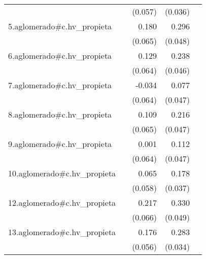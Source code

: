 {\begin{longtable}{l*{4}{D{.}{.}{-1}}}
            &                     &     (0.057)         &     (0.036)         &                     \\
\addlinespace
5.aglomerado#c.hv\_propieta&                     &       0.180\sym{**} &       0.296\sym{***}&                     \\
            &                     &     (0.065)         &     (0.048)         &                     \\
\addlinespace
6.aglomerado#c.hv\_propieta&                     &       0.129\sym{*}  &       0.238\sym{***}&                     \\
            &                     &     (0.064)         &     (0.046)         &                     \\
\addlinespace
7.aglomerado#c.hv\_propieta&                     &      -0.034         &       0.077         &                     \\
            &                     &     (0.064)         &     (0.047)         &                     \\
\addlinespace
8.aglomerado#c.hv\_propieta&                     &       0.109         &       0.216\sym{***}&                     \\
            &                     &     (0.065)         &     (0.047)         &                     \\
\addlinespace
9.aglomerado#c.hv\_propieta&                     &       0.001         &       0.112\sym{*}  &                     \\
            &                     &     (0.064)         &     (0.047)         &                     \\
\addlinespace
10.aglomerado#c.hv\_propieta&                     &       0.065         &       0.178\sym{***}&                     \\
            &                     &     (0.058)         &     (0.037)         &                     \\
\addlinespace
12.aglomerado#c.hv\_propieta&                     &       0.217\sym{***}&       0.330\sym{***}&                     \\
            &                     &     (0.066)         &     (0.049)         &                     \\
\addlinespace
13.aglomerado#c.hv\_propieta&                     &       0.176\sym{**} &       0.283\sym{***}&                     \\
            &                     &     (0.056)         &     (0.034)         &                     \\

\end{longtable}}
